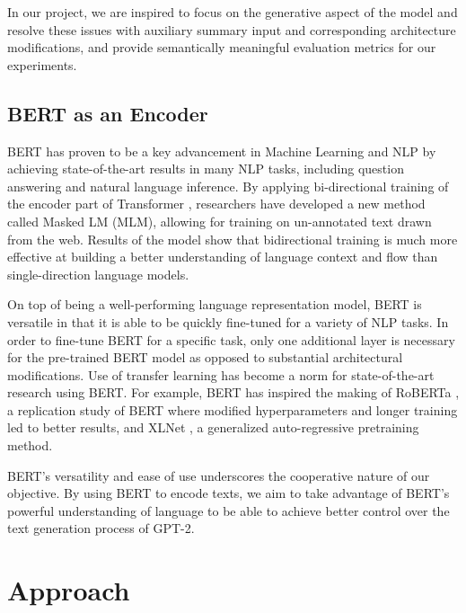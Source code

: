 \documentclass{article}
\begin{document}
In our project, we are inspired to focus on the generative aspect of the model and resolve these issues with auxiliary summary input and corresponding architecture modifications, and provide semantically meaningful evaluation metrics for our experiments.

\subsection{BERT as an Encoder}

BERT \cite{bert} has proven to be a key advancement in Machine Learning and NLP by achieving state-of-the-art results in many NLP tasks, including question answering and natural language inference. By applying bi-directional training of the encoder part of Transformer \cite{transformer}, researchers have developed a new method called Masked LM (MLM), allowing for training on un-annotated text drawn from the web. Results of the model show that bidirectional training is much more effective at building a better understanding of language context and flow than single-direction language models.

On top of being a well-performing language representation model, BERT is versatile in that it is able to be quickly fine-tuned for a variety of NLP tasks. In order to fine-tune BERT for a specific task, only one additional layer is necessary for the pre-trained BERT model as opposed to substantial architectural modifications. Use of transfer learning has become a norm for state-of-the-art research using BERT. For example, BERT has inspired the making of RoBERTa \cite{liu2019roberta}, a replication study of BERT where modified hyperparameters and longer training led to better results, and XLNet \cite{xlnet}, a generalized auto-regressive pretraining method.

BERT's versatility and ease of use underscores the cooperative nature of our objective. By using BERT to encode texts, we aim to take advantage of BERT's powerful understanding of language to be able to achieve better control over the text generation process of GPT-2.





\section{Approach}
\end{document}
